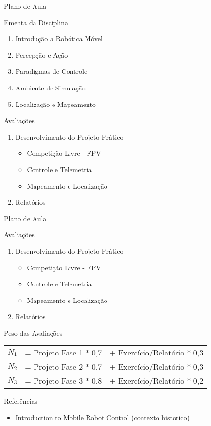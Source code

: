 \documentclass{beamer}
\begin{document}
\begin{frame}{Plano de Aula}
	\begin{block}{Ementa da Disciplina}
		\begin{enumerate}
			\item Introdução a Robótica Móvel
			\item Percepção e Ação
			\item Paradigmas de Controle
			\item Ambiente de Simulação
			\item Localização e Mapeamento
		\end{enumerate}
	\end{block}

	\begin{block}{Avaliações}
		\begin{enumerate}
			\item Desenvolvimento do Projeto Prático
				\begin{itemize}
					\item Competição Livre - FPV
					\item Controle e Telemetria
					\item Mapeamento e Localização
				\end{itemize}
			\item Relatórios
		\end{enumerate}
	\end{block}

\end{frame}



\begin{frame}{Plano de Aula}
	\begin{block}{Avaliações}
		\begin{enumerate}
			\item Desenvolvimento do Projeto Prático
				\begin{itemize}
					\item Competição Livre - FPV
					\item Controle e Telemetria
					\item Mapeamento e Localização
				\end{itemize}
			\item Relatórios
		\end{enumerate}
	\end{block}
	\begin{block}{Peso das Avaliações}
		\begin{tabular}{lll}
			\hline
			$N_1$ &= Projeto Fase 1 * 0,7&+ Exercício/Relatório * 0,3\\ 
			$N_2$ &= Projeto Fase 2 * 0,7&+ Exercício/Relatório * 0,3 \\ 
			$N_3$ &= Projeto Fase 3 * 0,8&+ Exercício/Relatório * 0,2 \\ 
			\hline
		\end{tabular}
	\end{block}
\end{frame}


\begin{frame}[t]{Referências}
    \begin{itemize}
        \item Introduction to Mobile Robot Control (contexto historico)
    \end{itemize}
\end{frame}
\end{document}
